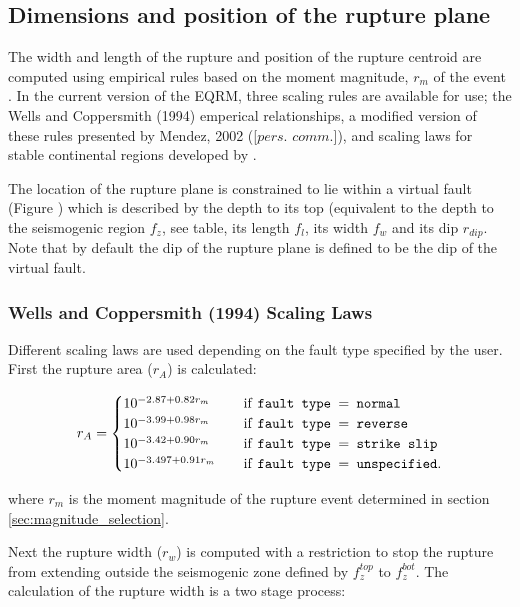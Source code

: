 \subsection{Dimensions and position of the rupture plane}
\label{sec:dim-rupture}

The width and length of the rupture and position of the rupture
centroid are computed using empirical
rules based on the moment magnitude, $r_m$ of the event . In the current version of the EQRM, three scaling 
rules are available for use; the Wells and Coppersmith (1994) emperical relationships, a modified version
of these rules presented by Mendez, 2002 ([$\textit{pers. comm.}$]), and scaling laws for stable continental regions developed by \citet{dr_leonard10}.

The location of the rupture plane
is constrained to lie within a virtual fault (Figure )
which is described by the depth to its top (equivalent to the
depth to the seismogenic region $f_z$, see
table, its length $f_l$, its width
$f_w$ and its dip $r_{dip}$. Note that by default the dip of the
 rupture plane is defined to be the dip of the virtual fault. 

\subsubsection{Wells and Coppersmith (1994) Scaling Laws}

Different scaling laws are used depending on the fault type specified by the user. First the rupture area ($r_A$) is calculated:

\begin{equation} \label{ra}
r_A = 
\begin{cases}
10^{-2.87 + 0.82r_m}	& \quad \mbox{if \texttt{fault type $=$  normal}} \\
10^{-3.99 + 0.98r_m}	& \quad \mbox{if \texttt{fault type $=$  reverse}} \\
10^{-3.42 + 0.90r_m}	& \quad \mbox{if \texttt{fault type $=$  strike slip}} \\
10^{-3.497 + 0.91r_m}	& \quad \mbox{if \texttt{fault type $=$  unspecified}} . \\
\end{cases}
\end{equation}

where $r_m$ is the moment magnitude of the rupture event determined in section \ref{sec:magnitude_selection}. 

Next the rupture width ($r_w$) is computed with a restriction to stop the rupture from extending 
outside the seismogenic zone defined by $f_z^{top}$ to $f_z^{bot}$. The calculation of the rupture width is a two stage process:


